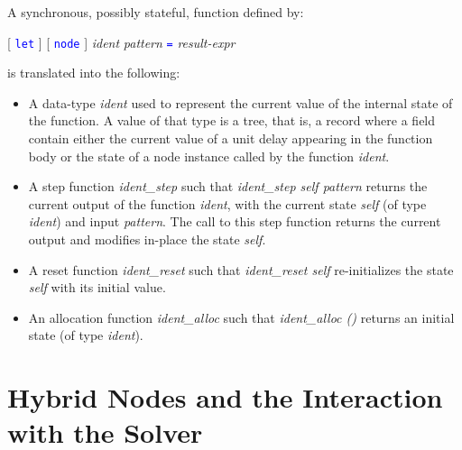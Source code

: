\documentclass[11pt,titlepage,twoside]{report}
\newcommand{\term}[1]{\textcolor{Blue}{\tt #1}}
\newcommand{\nterm}[1]{\textcolor{BrickRed}{\it #1}}
\newcommand{\term}[1]{{\tt #1}}
\newcommand{\nterm}[1]{{\em #1}}
\begin{document}
A synchronous, possibly stateful, function defined by:
\begin{center}
  [ \term{let} ] [ \term{node} ] \nterm{ident} \nterm{pattern} \term{=}
  \nterm{result-expr}
\end{center}
is translated into the following:
\begin{itemize}
\item
  A data-type \nterm{ident} used to represent the current value of the
  internal state of the function. A value of that type is a tree, that
  is, a record where a field contain either the current value of a unit delay
  appearing in the function body or the
  state of a node instance called by the function \nterm{ident}.
\item
  A step function \nterm{ident\_step} such that
    \nterm{ident\_step self pattern} returns the current output of the function
    \nterm{ident}, with the current state \nterm{self} (of type
    \nterm{ident}) and input \nterm{pattern}. The call to this step
    function returns the current output and modifies in-place
    the state \nterm{self}.
  \item
    A reset function \nterm{ident\_reset} such that \nterm{ident\_reset self}
    re-initializes the state \nterm{self} with its initial value.
  \item
    An allocation function \nterm{ident\_alloc} such that \nterm{ident\_alloc ()}
    returns an initial state (of type \nterm{ident}).
\end{itemize}

\section{Hybrid Nodes and the Interaction with the Solver\label{hybridnodes}} %
\end{document}
